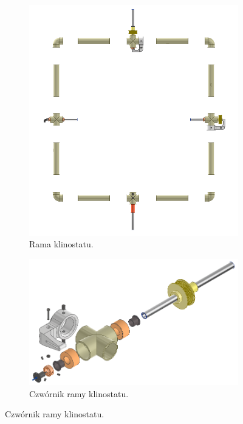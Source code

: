\begin{figure}[]
	\centering
	
	\begin{subfigure}[b]{.49\textwidth}
		\centering
		\includegraphics[width=\textwidth]{rama_40_aisass}
		\caption{Rama klinostatu.} 
		\label{fig:rama_klinostatu}
	\end{subfigure}
	\hfill%
	\begin{subfigure}[b]{.49\textwidth}
		\centering
		\includegraphics[width=\textwidth]{2_diss}
		\caption{Czwórnik ramy klinostatu.} 
		

\end{subfigure}
\end{figure}

